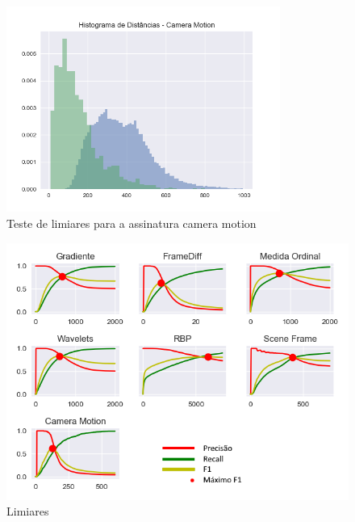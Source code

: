 \begin{figure}[h]
	\centering
	\label{fig:limiares-camera-motion}
	\caption{Teste de limiares para a assinatura camera motion}
	\includegraphics[width=0.8\textwidth]{dados/figuras/experimentos/histograma_Camera_Motion.png}
\end{figure}

\begin{figure}[h]
	\centering
	\label{fig:limiares}
	\caption{Limiares}
	\includegraphics[width=\textwidth]{dados/figuras/experimentos/todos_final.png}
\end{figure}



